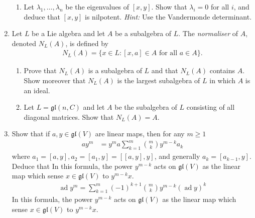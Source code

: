 \documentclass[12pt,a4paper]{report}
\newcommand{\AD}{\operatorname{ad}}
\begin{document}
\begin{enumerate}[label=5.\arabic*]
\begin{enumerate}[label=(\roman*)]
		\item Let $\lambda_1,\dots, \lambda_n$ be the eigenvalues of $[x,y]$.  Show that $\lambda_i=0$ for all $i$, and deduce that $[x,y]$ is nilpotent.  \textit{Hint:} Use the Vandermonde determinant.
	\end{enumerate}
	
	\item Let $L$ be a Lie algebra and let $A$ be a subalgebra of $L$.  The \textit{normaliser} of $A$, denoted $N_L(A)$, is defined by 
	\begin{align*}
		N_L(A) = \{x \in L : [x,a]\in A\text{ for all }a \in A\}.
	\end{align*}
	
	\begin{enumerate}[label=(\roman*)]
		\item Prove that $N_L(A)$ is a subalgebra of $L$ and that $N_L(A)$ contains $A$.  Show moreover that $N_L(A)$ is the largest subalgebra of $L$ in which $A$ is an ideal.
		
		\item Let $L=\mathfrak{gl}(n,C)$ and let $A$ be the subalgebra of $L$ consisting of all diagonal matrices.  Show that $N_L(A)=A$.
	
	\end{enumerate}
	
	\item Show that if $a,y\in \mathfrak{gl}(V)$ are linear maps, then for any $m \ge 1$
	\begin{align*}
		ay^m &= y^ma \sum_{k=1}^m\binom{m}{k}y^{m-k}a_k
	\end{align*}where $a_1=[a,y],a_2=[a_1,y]=[[a,y],y]$, and generally $a_k=[a_{k-1},y]$.  Deduce that In this formula, the power $y^{m-k}$ acts on $\mathfrak{gl}(V)$ as the linear map which sense $x \in \mathfrak{gl}(V)$ to $y^{m-k}x$.
	\begin{align*}
		\AD y^m = \sum_{k=1}^m (-1)^{k+1}\binom{m}{k} y^{m-k}(\AD y)^k
	\end{align*}In this formula, the power $y^{m-k}$ acts on $\mathfrak{gl}(V)$ as the linear map which sense $x \in \mathfrak{gl}(V)$ to $y^{m-k}x$.
\end{enumerate}
\end{document}
